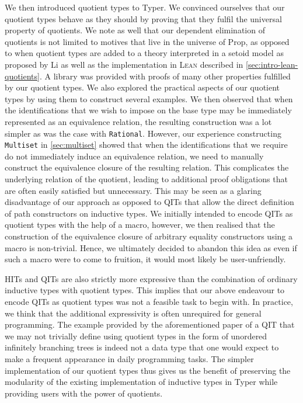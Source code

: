 \documentclass[12pt,twoside,maitrise]{dms}
\theoremstyle{definition}
\numberwithin{equation}{section}
\numberwithin{table}{chapter}
\numberwithin{figure}{chapter}
\newcommand\id[1] {\texttt{#1}}
\newcommand\type[1] {\textsf{#1}} %
\def\Lean{\textsc{Lean}\xspace}
\begin{document}
We then introduced quotient types to Typer. We convinced ourselves that our
quotient types behave as they should by proving that they fulfil the universal
property of quotients. We note as well that our dependent elimination of
quotients is not limited to motives that live in the universe of \type{Prop},
as opposed to when quotient types are added to a theory interpreted in a setoid
model as proposed by Li\cite{li2015quotient} as well as the implementation in
\Lean{} described in \autoref{sec:intro-lean-quotients}. A library was provided
with proofs of many other properties fulfilled by our quotient types. We also
explored the practical aspects of our quotient types by using them to construct
several examples. We then observed that when the identifications that we wish
to impose on the base type may be immediately represented as an equivalence
relation, the resulting construction was a lot simpler as was the case with
\id{Rational}. However, our experience constructing \id{Multiset} in
\autoref{sec:multiset} showed that when the identifications that we require do
not immediately induce an equivalence relation, we need to manually construct
the equivalence closure of the resulting relation. This complicates the
underlying relation of the quotient, leading to additional proof obligations
that are often easily satisfied but unnecessary. This may be seen as a glaring
disadvantage of our approach as opposed to QITs that allow the direct
definition of path constructors on inductive types. We initially intended to
encode QITs as quotient types with the help of a macro, however, we then
realised that the construction of the equivalence closure of arbitrary equality
constructors using a macro is non-trivial. Hence, we ultimately decided to
abandon this idea as even if such a macro were to come to fruition, it would
most likely be user-unfriendly.

HITs and QITs are also strictly more expressive than the combination of ordinary
inductive types with quotient types\cite{fiore2022quotients}. This implies that
our above endeavour to encode QITs as quotient types was not a feasible task to
begin with. In practice, we think that the additional expressivity is often
unrequired for general programming. The example provided by the aforementioned
paper of a QIT that we may not trivially define using quotient types in the form
of unordered infinitely branching trees is indeed not a data type that one would
expect to make a frequent appearance in daily programming tasks. The simpler
implementation of our quotient types thus gives us the benefit of preserving the
modularity of the existing implementation of inductive types in Typer while
providing users with the power of quotients.
\end{document}

